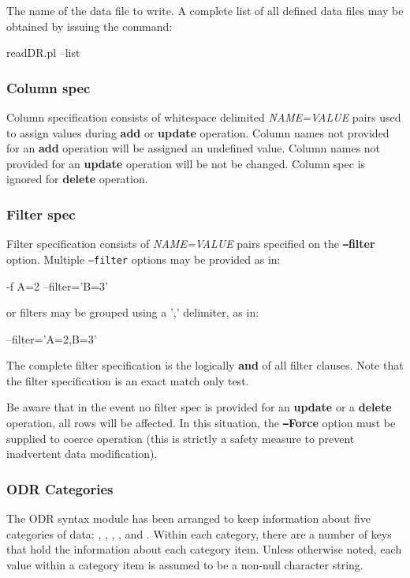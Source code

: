 The name of the data file to write. A complete list of all defined data files may
be obtained by issuing the command:

readDR.pl --list

\subsubsection*{Column spec}%

Column specification consists of whitespace delimited {\em NAME=VALUE\/} pairs
used to assign values during {\bf add} or {\bf update} operation. Column names
not provided for an {\bf add} operation will be assigned an undefined value.
Column names not provided for an {\bf update} operation will be not be changed.
Column spec is ignored for {\bf delete} operation.

\subsubsection*{Filter spec}%

Filter specification consists of {\em NAME=VALUE\/} pairs specified on the {\bf {\tt --}filter} option.
Multiple {\tt --filter} options may be provided as in:

-f A=2 --filter='B=3'

or filters may be grouped using a ',' delimiter, as in:

--filter='A=2,B=3'

The complete filter specification is the logically {\bf and} of all filter clauses. Note
that the filter specification is an exact match only test.

Be aware that in the event no filter spec is provided for an {\bf update} or a {\bf delete}
operation, all rows will be affected. In this situation, the {\bf {\tt --}Force} option must
be supplied to coerce operation (this is strictly a safety measure to prevent
inadvertent data modification).

\subsubsection{ODR Categories}

The ODR syntax module has been arranged to keep information about five
categories of data: , ,
, , and 
. Within each category, there are a number of keys 
that hold the information about each category item. Unless otherwise
noted, each value within a category item is assumed to be a non-null
character string.


